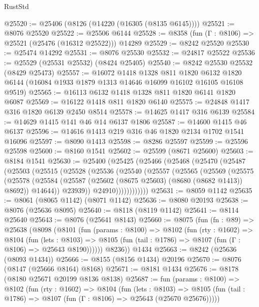 \begin{lexlean}{RustStd}
\begin{coremodule}
@25520 := @25406 (@8126 (@14220 (@16305 (@8135 @6145))))
@25521 := @8076 @25520
@25522 := @25506 @6144
@25528 := @8358 (fun (Γ : @8106) => @25521 (@25476 (@16312 @25522))) @14289
@25529 := @8242 @25520
@25530 := @25474 @14292
@25531 := @8076 @25530
@25532 := @24817 @25522
@25536 := @25529 (@25531 @25532) (@8424 @25405)
@25540 := @8242 @25530 @25532 (@8429 @25473)
@25557 := @16072
    @1418
    @1328
    @811
    @1820
    @6132
    @1820
    @6144
    (@16084 @1933 @1879 @1313 @14646 @16099 @16102 @16105 @16108 @9519)
@25565 := @16113 @6132 @1418 @1328 @811 @1820 @6141 @1820 @6087
@25569 := @16122 @1418 @811 @1820 @6140
@25575 := @24848 @1417 @316 @1820 @6139 @2450 @8514
@25578 := @14625 @1417 @316 @6139
@25584 := @14629 @1415 @141 @46 @14 @6137 @1806
@25587 := @14600 @1415 @46 @6137
@25596 := @14616 @1413 @219 @316 @46 @1820 @2134 @1702 @1541 @16096
@25597 := @8090 @1413
@25598 := @8286 @25597
@25599 := @25596 @25598
@25600 := @8160 @1541
@25602 := @25599 (@8671 @25600)
@25603 := @8184 @1541
@25630 := @25400
    (@25425
      (@25466
        (@25468
          (@25470
            (@25487
              (@25503
                (@25515
                  (@25528
                    (@25536
                      (@25540
                        (@25557
                          (@25565
                            (@25569
                              (@25575
                                (@25578
                                  (@25584
                                    (@25587 (@25602 (@8675 @25603) (@8680 (@8682 @1413)) @8692))
                                    @14644))
                                @23939))
                            @24910))))))))))))
@25631 := @8059 @1142
@25635 := @8061 (@8065 @1142) (@8071 @1142)
@25636 := @8080 @20193
@25638 := @8076 (@25636 @8095)
@25640 := @8118 (@8119 @1142)
@25641 := @8114 @25640
@25643 := @8076 (@25641 @8143)
@25660 := @8075
    (fun (fn : @89) =>
    @25638
      (@8098
        (@8101
          (fun (params : @8100) =>
          @8102
            (fun (rty : @1602) =>
            @8104
              (fun (lets : @8103) =>
              @8105 (fun (tail : @1786) => @8107 (fun (Γ : @8106) => @25643 @8190))))))
        @8236))
    @1434
@25663 := @8242 (@25636 (@8093 @1434))
@25666 := @8155 (@8156 @1434) @20196
@25670 := @8076 (@8147 (@25666 @8164) @8168)
@25671 := @8181 @1434
@25676 := @8178 (@8180 @25671 @20199 @8136 @8138)
@25687 := fun (params : @8100) =>
  @8102
    (fun (rty : @1602) =>
    @8104
      (fun (lets : @8103) =>
      @8105 (fun (tail : @1786) => @8107 (fun (Γ : @8106) => @25643 (@25670 @25676)))))

\end{coremodule}
\end{lexlean}
